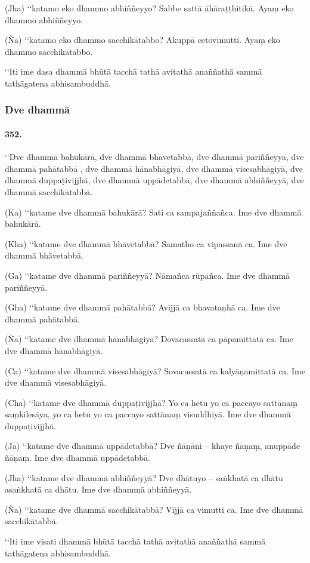 (Jha) ‘‘katamo eko dhammo abhiññeyyo? Sabbe sattā āhāraṭṭhitikā. Ayaṃ eko dhammo abhiññeyyo.

(Ña) ‘‘katamo eko dhammo sacchikātabbo? Akuppā cetovimutti. Ayaṃ eko dhammo sacchikātabbo.

‘‘Iti ime dasa dhammā bhūtā tacchā tathā avitathā anaññathā sammā tathāgatena abhisambuddhā.

\subsubsection{Dve dhammā}

\paragraph{352.} ‘‘Dve dhammā bahukārā, dve dhammā bhāvetabbā, dve dhammā pariññeyyā, dve dhammā pahātabbā , dve dhammā hānabhāgiyā, dve dhammā visesabhāgiyā, dve dhammā duppaṭivijjhā, dve dhammā uppādetabbā, dve dhammā abhiññeyyā, dve dhammā sacchikātabbā.

(Ka) ‘‘katame dve dhammā bahukārā? Sati ca sampajaññañca. Ime dve dhammā bahukārā.

(Kha) ‘‘katame dve dhammā bhāvetabbā? Samatho ca vipassanā ca. Ime dve dhammā bhāvetabbā.

(Ga) ‘‘katame dve dhammā pariññeyyā? Nāmañca rūpañca. Ime dve dhammā pariññeyyā.

(Gha) ‘‘katame dve dhammā pahātabbā? Avijjā ca bhavataṇhā ca. Ime dve dhammā pahātabbā.

(Ṅa) ‘‘katame dve dhammā hānabhāgiyā? Dovacassatā ca pāpamittatā ca. Ime dve dhammā hānabhāgiyā.

(Ca) ‘‘katame dve dhammā visesabhāgiyā? Sovacassatā ca kalyāṇamittatā ca. Ime dve dhammā visesabhāgiyā.

(Cha) ‘‘katame dve dhammā duppaṭivijjhā? Yo ca hetu yo ca paccayo sattānaṃ saṃkilesāya, yo ca hetu yo ca paccayo sattānaṃ visuddhiyā. Ime dve dhammā duppaṭivijjhā.

(Ja) ‘‘katame dve dhammā uppādetabbā? Dve ñāṇāni – khaye ñāṇaṃ, anuppāde ñāṇaṃ. Ime dve dhammā uppādetabbā.

(Jha) ‘‘katame dve dhammā abhiññeyyā? Dve dhātuyo – saṅkhatā ca dhātu asaṅkhatā ca dhātu. Ime dve dhammā abhiññeyyā.

(Ña) ‘‘katame dve dhammā sacchikātabbā? Vijjā ca vimutti ca. Ime dve dhammā sacchikātabbā.

‘‘Iti ime vīsati dhammā bhūtā tacchā tathā avitathā anaññathā sammā tathāgatena abhisambuddhā.

